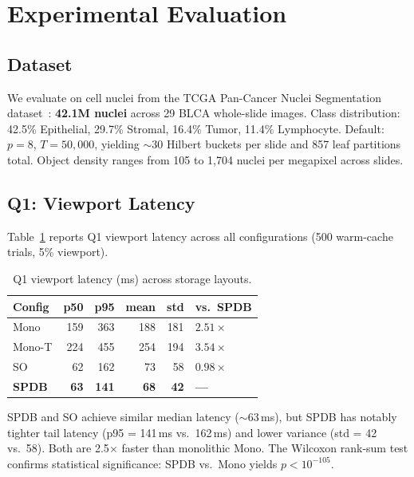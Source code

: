 \documentclass[10pt,twocolumn]{article}
\begin{document}
\section{Experimental Evaluation}
\label{sec:evaluation}

\subsection{Dataset}

We evaluate on cell nuclei from the TCGA Pan-Cancer Nuclei Segmentation dataset~\cite{saltz2018spatial}: \textbf{42.1M nuclei} across 29 BLCA whole-slide images.
Class distribution: 42.5\% Epithelial, 29.7\% Stromal, 16.4\% Tumor, 11.4\% Lymphocyte.
Default: $p{=}8$, $T{=}50{,}000$, yielding $\sim$30 Hilbert buckets per slide and 857 leaf partitions total.
Object density ranges from 105 to 1{,}704 nuclei per megapixel across slides.

\subsection{Q1: Viewport Latency}
\label{sec:q1}

Table~\ref{tab:q1_master} reports Q1 viewport latency across all configurations (500 warm-cache trials, 5\% viewport).

\begin{table}[t]
\centering
\caption{Q1 viewport latency (ms) across storage layouts.}
\label{tab:q1_master}
\begin{tabular}{@{}lrrrrl@{}}
\toprule
\textbf{Config} & \textbf{p50} & \textbf{p95} & \textbf{mean} & \textbf{std} & \textbf{vs.\ SPDB} \\
\midrule
Mono & 159 & 363 & 188 & 181 & $2.51\times$ \\
Mono-T & 224 & 455 & 254 & 194 & $3.54\times$ \\
SO & 62 & 162 & 73 & 58 & $0.98\times$ \\
\textbf{SPDB} & \textbf{63} & \textbf{141} & \textbf{68} & \textbf{42} & \textbf{---} \\
\bottomrule
\end{tabular}
\end{table}

SPDB and SO achieve similar median latency ($\sim$63\,ms), but SPDB has notably tighter tail latency (p95 = 141\,ms vs.\ 162\,ms) and lower variance (std = 42 vs.\ 58).
Both are 2.5$\times$ faster than monolithic Mono.
The Wilcoxon rank-sum test confirms statistical significance: SPDB vs.\ Mono yields $p < 10^{-105}$.
\end{document}
